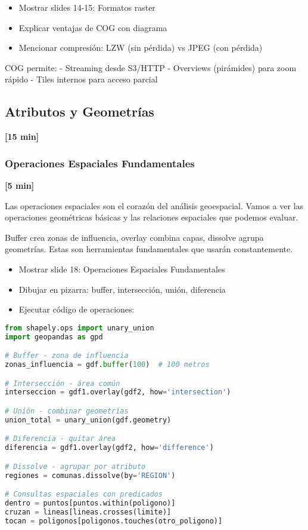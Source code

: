 \documentclass[11pt,a4paper]{article}
\newcommand{\tiempo}[1]{\textcolor{timecolor}{\textbf{[#1]}}}
\newcommand{\decir}[1]{\begin{tcolorbox}[colback=blue!5,colframe=usachblue,title={DECIR}]#1\end{tcolorbox}}
\newcommand{\hacer}[1]{\begin{tcolorbox}[colback=green!5,colframe=green!50!black,title={HACER}]#1\end{tcolorbox}}
\newcommand{\nota}[1]{\begin{tcolorbox}[colback=yellow!10,colframe=orange,title={NOTA}]#1\end{tcolorbox}}
\begin{document}
\hacer{
\begin{itemize}
    \item Mostrar slides 14-15: Formatos raster
    \item Explicar ventajas de COG con diagrama
    \item Mencionar compresión: LZW (sin pérdida) vs JPEG (con pérdida)
\end{itemize}
}

\nota{
COG permite:
- Streaming desde S3/HTTP
- Overviews (pirámides) para zoom rápido
- Tiles internos para acceso parcial
}

\subsection{Atributos y Geometrías} \tiempo{15 min}

\subsubsection{Operaciones Espaciales Fundamentales} \tiempo{5 min}

\decir{
Las operaciones espaciales son el corazón del análisis geoespacial. Vamos a ver las operaciones geométricas básicas y las relaciones espaciales que podemos evaluar.

Buffer crea zonas de influencia, overlay combina capas, dissolve agrupa geometrías. Estas son herramientas fundamentales que usarán constantemente.
}

\hacer{
\begin{itemize}
    \item Mostrar slide 18: Operaciones Espaciales Fundamentales
    \item Dibujar en pizarra: buffer, intersección, unión, diferencia
    \item Ejecutar código de operaciones:
\end{itemize}
}

\begin{lstlisting}[language=Python]
from shapely.ops import unary_union
import geopandas as gpd

# Buffer - zona de influencia
zonas_influencia = gdf.buffer(100)  # 100 metros

# Intersección - área común
interseccion = gdf1.overlay(gdf2, how='intersection')

# Unión - combinar geometrías
union_total = unary_union(gdf.geometry)

# Diferencia - quitar área
diferencia = gdf1.overlay(gdf2, how='difference')

# Dissolve - agrupar por atributo
regiones = comunas.dissolve(by='REGION')

# Consultas espaciales con predicados
dentro = puntos[puntos.within(poligono)]
cruzan = lineas[lineas.crosses(limite)]
tocan = poligonos[poligonos.touches(otro_poligono)]
\end{lstlisting}
\end{document}
